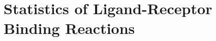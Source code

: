 \documentclass[twocolumn]{IEEEtran}
\begin{document}



\section{Statistics of Ligand-Receptor Binding Reactions}
\label{sec:statistics}
\end{document}
